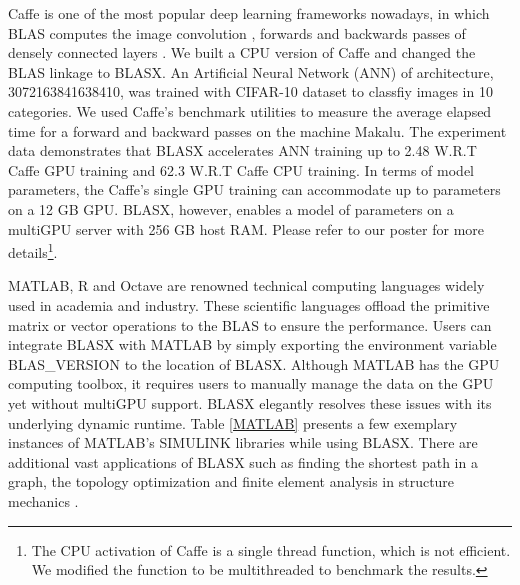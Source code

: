 \documentclass[conference]{IEEEtran}
\begin{document}
\begin{inparaenum} 

\item Caffe \cite{caffe} is one of the most popular deep learning frameworks nowadays, in which 
BLAS computes the image convolution \cite{img_conv}, forwards and backwards passes of densely connected
layers \cite{ANN}. We built a CPU version of Caffe and changed the BLAS linkage to BLASX.
An Artificial Neural Network (ANN) of architecture, 3072163841638410, 
was trained with CIFAR-10 dataset \cite{cifar10} to classfiy images in 10 categories. We used
Caffe's benchmark utilities to measure the average elapsed time for a forward and backward passes
on the machine Makalu. The experiment data demonstrates that BLASX accelerates ANN 
training up to 2.48 W.R.T Caffe GPU training and 62.3 W.R.T Caffe CPU training. In terms
of model parameters, the Caffe's single GPU training can accommodate up to  parameters
on a 12 GB GPU. BLASX, however, enables a model of  parameters on a multiGPU server
with 256 GB host RAM. Please refer to our poster \cite{ANN_BLASX} for more details\footnote{The CPU
activation of Caffe is a single thread function, which is not efficient. We modified the function to be 
multithreaded to benchmark the results.}.

\item MATLAB, R and Octave are renowned technical computing languages widely used in academia
and industry. These scientific languages offload the primitive matrix or vector operations to the BLAS to
ensure the performance. Users can integrate BLASX with MATLAB by simply exporting the 
environment variable BLAS\_VERSION to the location of BLASX.
Although MATLAB has the GPU computing toolbox, it requires users to manually manage the data on the GPU
yet without multiGPU support. BLASX elegantly resolves these issues with 
its underlying dynamic runtime. Table \ref{MATLAB} presents a few exemplary instances of MATLAB's 
SIMULINK libraries while using BLASX. There are additional vast applications of BLASX such as finding the shortest path in a graph, 
the topology optimization\cite{topology_optimization} and finite element analysis in structure mechanics \cite{FEM}.


\end{inparaenum}
\end{document}
